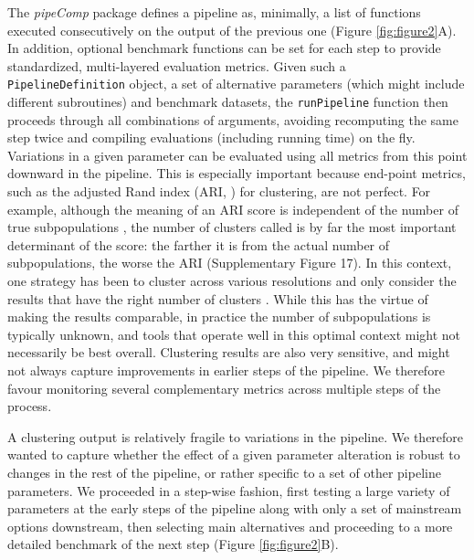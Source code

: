 \documentclass{bmcart}
\begin{document}
The \textit{pipeComp} package defines a pipeline as, minimally, a list of functions executed consecutively on the output of the previous one (Figure \ref{fig:figure2}A). In addition, optional benchmark functions can be set for each step to provide standardized, multi-layered evaluation metrics. Given such a \texttt{PipelineDefinition} object, a set of alternative parameters (which might include different subroutines) and benchmark datasets, the \texttt{runPipeline} function then proceeds through all combinations of arguments, avoiding recomputing the same step twice and compiling evaluations (including running time) on the fly. Variations in a given parameter can be evaluated using all metrics from this point downward in the pipeline. This is especially important because end-point metrics, such as the adjusted Rand index (ARI, \citep{HubertARI1985}) for clustering, are not perfect. For example, although the meaning of an ARI score is independent of the number of true subpopulations \citep{steinley_properties_2004}, the number of clusters called is by far the most important determinant of the score: the farther it is from the actual number of subpopulations, the worse the ARI (Supplementary Figure 17). In this context, one strategy has been to cluster across various resolutions and only consider the results that have the right number of clusters \citep{duoClustering2018}. While this has the virtue of making the results comparable, in practice the number of subpopulations is typically unknown, and tools that operate well in this optimal context might not necessarily be best overall. Clustering results are also very sensitive, and might not always capture improvements in earlier steps of the pipeline. We therefore favour monitoring several complementary metrics across multiple steps of the process.

A clustering output is relatively fragile to variations in the pipeline. We therefore wanted to capture whether the effect of a given parameter alteration is robust to changes in the rest of the pipeline, or rather specific to a set of other pipeline parameters. We proceeded in a step-wise fashion, first testing a large variety of parameters at the early steps of the pipeline along with only a set of mainstream options downstream, then selecting main alternatives and proceeding to a more detailed benchmark of the next step (Figure \ref{fig:figure2}B).
\end{document}
